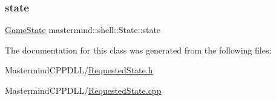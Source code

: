 \subsubsection{\texorpdfstring{state}{state}}
{\footnotesize\ttfamily \hyperlink{classmastermind_1_1shell_1_1_state_a7667dd4920335355f616e9ffc2793d0b}{Game\+State} mastermind\+::shell\+::\+State\+::state\hspace{0.3cm}{\ttfamily [private]}}



The documentation for this class was generated from the following files\+:\begin{DoxyCompactItemize}
\item 
Mastermind\+C\+P\+P\+D\+L\+L/\hyperlink{_requested_state_8h}{Requested\+State.\+h}\item 
Mastermind\+C\+P\+P\+D\+L\+L/\hyperlink{_requested_state_8cpp}{Requested\+State.\+cpp}\end{DoxyCompactItemize}
